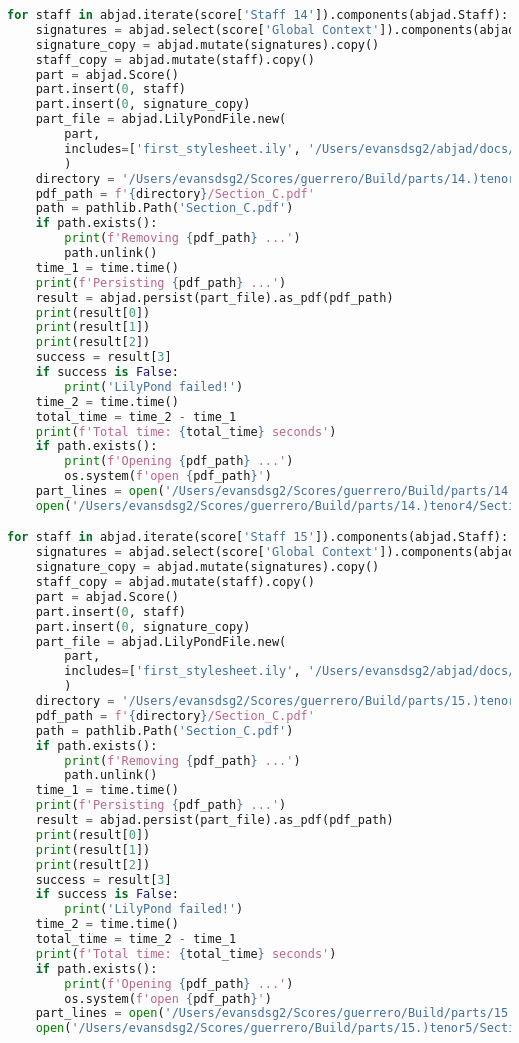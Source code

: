 \begin{lstlisting}[language=Python, caption=Invocation Source Code]
for staff in abjad.iterate(score['Staff 14']).components(abjad.Staff):
    signatures = abjad.select(score['Global Context']).components(abjad.Staff)
    signature_copy = abjad.mutate(signatures).copy()
    staff_copy = abjad.mutate(staff).copy()
    part = abjad.Score()
    part.insert(0, staff)
    part.insert(0, signature_copy)
    part_file = abjad.LilyPondFile.new(
        part,
        includes=['first_stylesheet.ily', '/Users/evansdsg2/abjad/docs/source/_stylesheets/abjad.ily'],
        )
    directory = '/Users/evansdsg2/Scores/guerrero/Build/parts/14.)tenor4'
    pdf_path = f'{directory}/Section_C.pdf'
    path = pathlib.Path('Section_C.pdf')
    if path.exists():
        print(f'Removing {pdf_path} ...')
        path.unlink()
    time_1 = time.time()
    print(f'Persisting {pdf_path} ...')
    result = abjad.persist(part_file).as_pdf(pdf_path)
    print(result[0])
    print(result[1])
    print(result[2])
    success = result[3]
    if success is False:
        print('LilyPond failed!')
    time_2 = time.time()
    total_time = time_2 - time_1
    print(f'Total time: {total_time} seconds')
    if path.exists():
        print(f'Opening {pdf_path} ...')
        os.system(f'open {pdf_path}')
    part_lines = open('/Users/evansdsg2/Scores/guerrero/Build/parts/14.)tenor4/Section_C.ly').readlines()
    open('/Users/evansdsg2/Scores/guerrero/Build/parts/14.)tenor4/Section_C.ly', 'w').writelines(part_lines[15:-1])

for staff in abjad.iterate(score['Staff 15']).components(abjad.Staff):
    signatures = abjad.select(score['Global Context']).components(abjad.Staff)
    signature_copy = abjad.mutate(signatures).copy()
    staff_copy = abjad.mutate(staff).copy()
    part = abjad.Score()
    part.insert(0, staff)
    part.insert(0, signature_copy)
    part_file = abjad.LilyPondFile.new(
        part,
        includes=['first_stylesheet.ily', '/Users/evansdsg2/abjad/docs/source/_stylesheets/abjad.ily'],
        )
    directory = '/Users/evansdsg2/Scores/guerrero/Build/parts/15.)tenor5'
    pdf_path = f'{directory}/Section_C.pdf'
    path = pathlib.Path('Section_C.pdf')
    if path.exists():
        print(f'Removing {pdf_path} ...')
        path.unlink()
    time_1 = time.time()
    print(f'Persisting {pdf_path} ...')
    result = abjad.persist(part_file).as_pdf(pdf_path)
    print(result[0])
    print(result[1])
    print(result[2])
    success = result[3]
    if success is False:
        print('LilyPond failed!')
    time_2 = time.time()
    total_time = time_2 - time_1
    print(f'Total time: {total_time} seconds')
    if path.exists():
        print(f'Opening {pdf_path} ...')
        os.system(f'open {pdf_path}')
    part_lines = open('/Users/evansdsg2/Scores/guerrero/Build/parts/15.)tenor5/Section_C.ly').readlines()
    open('/Users/evansdsg2/Scores/guerrero/Build/parts/15.)tenor5/Section_C.ly', 'w').writelines(part_lines[15:-1])


\end{lstlisting}
